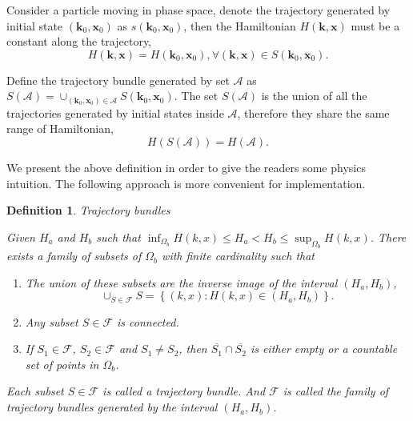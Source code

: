 \documentclass{article}
\newtheorem{defi}{Definition}
\numberwithin{equation}{section}
\begin{document}
Consider a particle moving in phase space, denote the trajectory generated by initial state $(\mathbf{k}_{0},\mathbf{x}_{0})$ as $s(\mathbf{k}_{0},\mathbf{x}_{0})$, then the Hamiltonian $H(\mathbf{k}, \mathbf{x})$ must be a constant along the trajectory,
\begin{equation*}
    H(\mathbf{k},\mathbf{x})=H(\mathbf{k}_{0},\mathbf{x}_{0}),\forall(\mathbf{k},\mathbf{x})\in S(\mathbf{k}_{0},\mathbf{x}_{0}).
\end{equation*}

Define the trajectory bundle generated by set $\mathcal{A}$ as $S(\mathcal{A})=\cup_{(\mathbf{k}_{0},\mathbf{x}_{0})\in\mathcal{A}}S(\mathbf{k}_{0},\mathbf{x}_{0})$. The set $S(\mathcal{A})$ is the union of all the trajectories generated by initial states inside $\mathcal{A}$, therefore they share the same range of Hamiltonian,
\begin{equation*}
    H(S(\mathcal{A}))=H(\mathcal{A}).
\end{equation*}

We present the above definition in order to give the readers some physics intuition. The following approach is more convenient for implementation.

\begin{defi}{Trajectory bundles}

    Given $H_{a}$ and $H_{b}$ such that $\inf_{\Omega_{b}}H(k,x)\leq H_{a}<H_{b}\leq\sup_{\Omega_{b}}H(k,x)$. There exists a family of subsets of $\Omega_{b}$ with finite cardinality such that
    \begin{enumerate}
        \item The union of these subsets are the inverse image of the interval $\left(H_{a},H_{b}\right)$,
        \begin{equation}
            \cup_{S\in\mathcal{F}}S=\left\{ \left(k,x\right):H(k,x)\in\left(H_{a},H_{b}\right)\right\}.
        \end{equation}
        \item Any subset $S\in \mathcal{F}$ is connected.
        \item If $S_{1} \in \mathcal{F}$, $S_{2} \in \mathcal{F}$ and $S_{1} \neq S_{2}$, then $\overline{S_{1}} \cap \overline{S_{2}}$ is either empty or a countable set of points in $\Omega_{b}$.
    \end{enumerate}

    Each subset $S \in \mathcal{F}$ is called a trajectory bundle. And $\mathcal{F}$ is called the family of trajectory bundles generated by the interval $\left(H_{a},H_{b}\right)$.

\end{defi}
\end{document}

